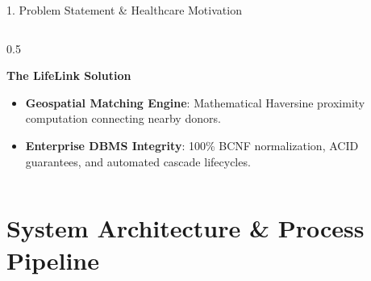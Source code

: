 \documentclass[aspectratio=169,10pt]{beamer}
\begin{document}
\begin{frame}{1. Problem Statement \& Healthcare Motivation}
\begin{columns}[T]
\begin{column}{0.5\textwidth}
\begin{alertblock}{\textbf{The LifeLink Solution}}
\begin{itemize}
                    \item \textbf{Geospatial Matching Engine}: Mathematical Haversine proximity computation connecting nearby donors.
                    \item \textbf{Enterprise DBMS Integrity}: 100\% BCNF normalization, ACID guarantees, and automated cascade lifecycles.
                \end{itemize}
            \end{alertblock}
        \end{column}
    \end{columns}
\end{frame}

\section{System Architecture \& Process Pipeline}
\end{document}
